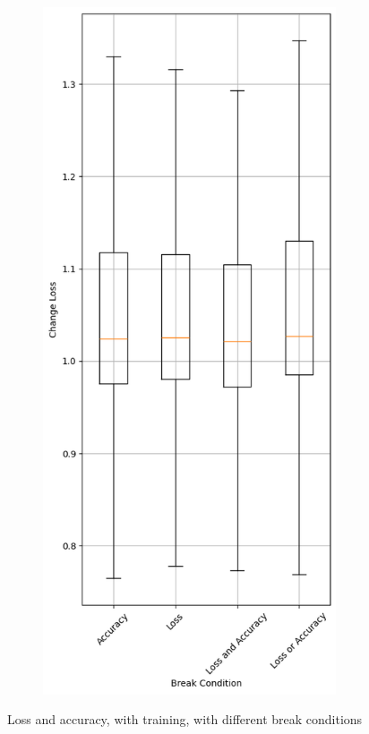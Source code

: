 \begin{figure}
\begin{subfigure}{0.5\textwidth}
    \end{subfigure}
    \begin{subfigure}{0.5\textwidth}
        \centering
        \includegraphics[width=0.95\textwidth]{plots/BreakCondition_Trained_loss.png}
    \end{subfigure}
    \caption{Loss and accuracy, with training, with different break conditions}
    \label{fig:break-conditions-training}
\end{figure}
